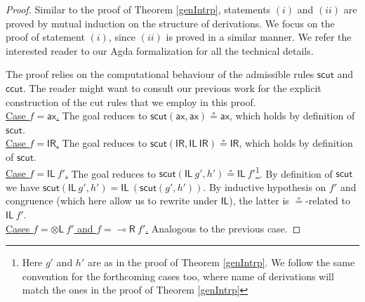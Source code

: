 \documentclass[sn-mathphys-num]{sn-jnl}%
\newcommand{\vd}{\vdash}
\newcommand{\tl}{\otimes \mathsf{L}}
\newcommand{\unitl}{\mathsf{IL}}
\newcommand{\unitr}{\mathsf{IR}}
\newcommand{\ax}{\mathsf{ax}}
\newcommand{\lolli}{\multimap}
\newcommand{\lright}{{\lolli}\mathsf{R}}
\newcommand{\mf}[1]{\mathsf{#1}}
\theoremstyle{thmstyleone}%
\theoremstyle{thmstyletwo}%
\theoremstyle{thmstylethree}%
\begin{document}
\cutIntrp
\begin{proof}
  Similar to the proof of Theorem \ref{genIntrp}, statements $(i)$ and $(ii)$ are proved by mutual induction on the structure of derivations.
  We focus on the proof of statement $(i)$, since $(ii)$ is proved in a similar manner. We refer the interested reader to our Agda formalization for all the technical details.

  The proof relies on the computational behaviour of the admissible rules $\mf{scut}$ and $\mf{ccut}$. The reader might want to consult our previous work \cite{uustalu:sequent:2021,wan2024} for the explicit construction of the cut rules that we employ in this proof. \\
  \underline{Case $f = \ax$.} The goal reduces to $\mf{scut} (\ax , \ax) \circeq \ax$, which holds by definition of $\mf{scut}$.
  \\
  \underline{Case $f = \unitr$.} The goal reduces to $\mf{scut} (\unitr , \unitl\  \unitr) \circeq \unitr$, which holds by definition of $\mf{scut}$. %
  \\
  \underline{Case $f = \unitl \ f'$.} The goal reduces to $\mf{scut} (\unitl \ g', h') \circeq \unitl\ f'$\footnote{Here $g'$ and $h'$ are as in the proof of Theorem \ref{genIntrp}. We follow the same convention for the forthcoming cases too, where name of derivations will match the ones in the proof of Theorem \ref{genIntrp}}. By definition of $\mf{scut}$ we have $\mf{scut} (\unitl \ g', h') = \unitl\ (\mf{scut} (g', h'))$. By inductive hypothesis on $f'$ and congruence (which here allow us to rewrite under $\unitl$), the latter is $\circeq$-related to $\unitl\ f'$.
  \\
  \underline{Cases $f = \tl \ f'$ and $f = \lright \ f'$.} Analogous to the previous case.

\end{proof}
\end{document}

